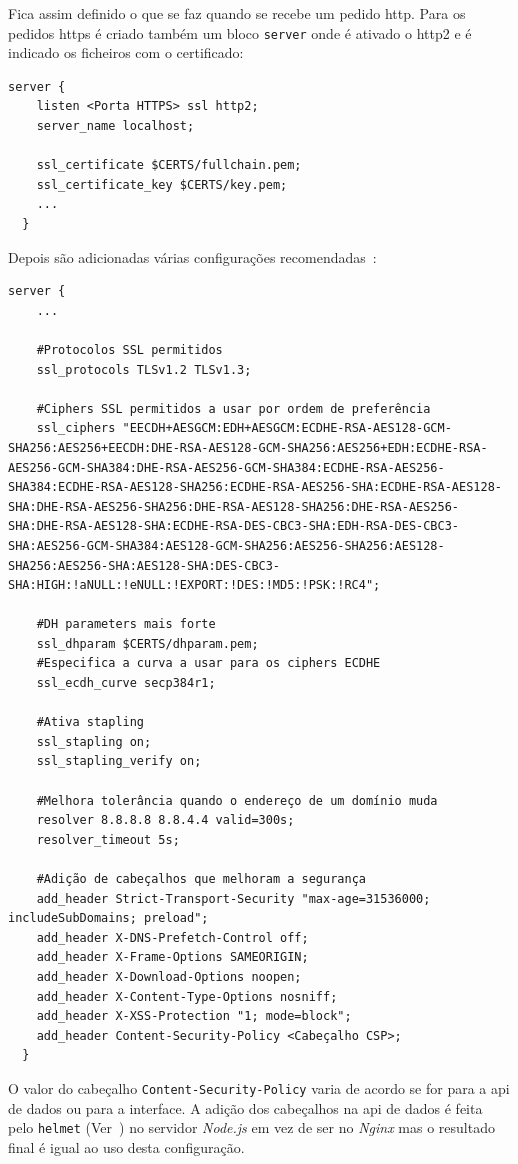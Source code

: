 Fica assim definido o que se faz quando se recebe um pedido \acrshort{http}. Para os pedidos \acrshort{https} é criado também um bloco \texttt{server} onde é ativado o \acrshort{http}2 e é indicado os ficheiros com o certificado:
\begin{lstlisting}[caption=Certificado na configuração \textit{Nginx}]
  server {
    listen <Porta HTTPS> ssl http2;
    server_name localhost;

    ssl_certificate $CERTS/fullchain.pem;
    ssl_certificate_key $CERTS/key.pem;
    ...
  }
\end{lstlisting}
Depois são adicionadas várias configurações recomendadas~\cite{helmet,letEnA+,dhparams,secExpress,strongSSL,helmetCSP,csp,hsts,hsts2}:
\begin{lstlisting}[caption=Recomendações de segurança na configuração \textit{Nginx}]
  server {
    ...

    #Protocolos SSL permitidos
    ssl_protocols TLSv1.2 TLSv1.3;

    #Ciphers SSL permitidos a usar por ordem de preferência
    ssl_ciphers "EECDH+AESGCM:EDH+AESGCM:ECDHE-RSA-AES128-GCM-SHA256:AES256+EECDH:DHE-RSA-AES128-GCM-SHA256:AES256+EDH:ECDHE-RSA-AES256-GCM-SHA384:DHE-RSA-AES256-GCM-SHA384:ECDHE-RSA-AES256-SHA384:ECDHE-RSA-AES128-SHA256:ECDHE-RSA-AES256-SHA:ECDHE-RSA-AES128-SHA:DHE-RSA-AES256-SHA256:DHE-RSA-AES128-SHA256:DHE-RSA-AES256-SHA:DHE-RSA-AES128-SHA:ECDHE-RSA-DES-CBC3-SHA:EDH-RSA-DES-CBC3-SHA:AES256-GCM-SHA384:AES128-GCM-SHA256:AES256-SHA256:AES128-SHA256:AES256-SHA:AES128-SHA:DES-CBC3-SHA:HIGH:!aNULL:!eNULL:!EXPORT:!DES:!MD5:!PSK:!RC4";

    #DH parameters mais forte
    ssl_dhparam $CERTS/dhparam.pem;
    #Especifica a curva a usar para os ciphers ECDHE
    ssl_ecdh_curve secp384r1;

    #Ativa stapling
    ssl_stapling on;
    ssl_stapling_verify on;

    #Melhora tolerância quando o endereço de um domínio muda
    resolver 8.8.8.8 8.8.4.4 valid=300s;
    resolver_timeout 5s;

    #Adição de cabeçalhos que melhoram a segurança
    add_header Strict-Transport-Security "max-age=31536000; includeSubDomains; preload";
    add_header X-DNS-Prefetch-Control off;
    add_header X-Frame-Options SAMEORIGIN;
    add_header X-Download-Options noopen;
    add_header X-Content-Type-Options nosniff;
    add_header X-XSS-Protection "1; mode=block";
    add_header Content-Security-Policy <Cabeçalho CSP>;
  }
\end{lstlisting}
O valor do cabeçalho \texttt{Content-Security-Policy} varia de acordo se for para a \acrshort{api} de dados ou para a interface. A adição dos cabeçalhos na \acrshort{api} de dados é feita pelo \texttt{helmet} (Ver~\cite{helmet}) no servidor \textit{Node.js} em vez de ser no \textit{Nginx} mas o resultado final é igual ao uso desta configuração.

